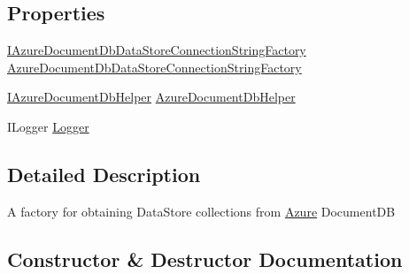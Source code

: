 \subsection*{Properties}
\begin{DoxyCompactItemize}
\item 
\hyperlink{interfaceCqrs_1_1Azure_1_1DocumentDb_1_1Factories_1_1IAzureDocumentDbDataStoreConnectionStringFactory}{I\+Azure\+Document\+Db\+Data\+Store\+Connection\+String\+Factory} \hyperlink{classCqrs_1_1Azure_1_1DocumentDb_1_1Factories_1_1AzureDocumentDbDataStoreFactory_ae5d98dfa935092643fe451ca64cd84e7}{Azure\+Document\+Db\+Data\+Store\+Connection\+String\+Factory}
\item 
\hyperlink{interfaceCqrs_1_1Azure_1_1DocumentDb_1_1IAzureDocumentDbHelper}{I\+Azure\+Document\+Db\+Helper} \hyperlink{classCqrs_1_1Azure_1_1DocumentDb_1_1Factories_1_1AzureDocumentDbDataStoreFactory_a0fd0cb66b802fd374dbf8f89e7cdfbdc}{Azure\+Document\+Db\+Helper}
\item 
I\+Logger \hyperlink{classCqrs_1_1Azure_1_1DocumentDb_1_1Factories_1_1AzureDocumentDbDataStoreFactory_af0e1e5053d7d5d076de970c579b1f1bb}{Logger}
\end{DoxyCompactItemize}


\subsection{Detailed Description}
A factory for obtaining Data\+Store collections from \hyperlink{namespaceCqrs_1_1Azure}{Azure} Document\+DB 



\subsection{Constructor \& Destructor Documentation}
\mbox{\label{classCqrs_1_1Azure_1_1DocumentDb_1_1Factories_1_1AzureDocumentDbDataStoreFactory_a7bafe0acfcbb5eaacb5cd2714c39fa08}} 
